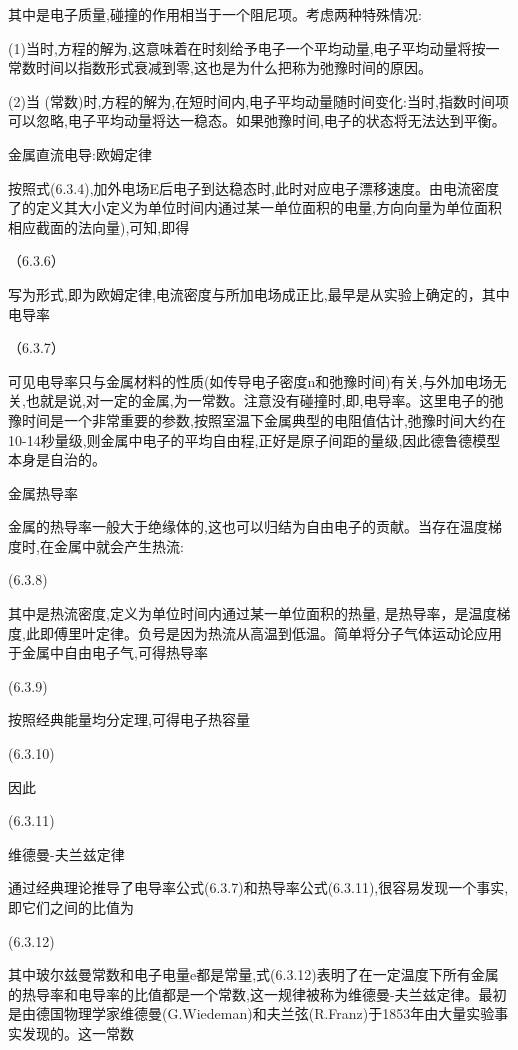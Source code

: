 其中是电子质量,碰撞的作用相当于一个阻尼项。考虑两种特殊情况:

(1)当时,方程的解为,这意味着在时刻给予电子一个平均动量,电子平均动量将按一常数时间以指数形式衰减到零,这也是为什么把称为弛豫时间的原因。

(2)当 (常数)时,方程的解为,在短时间内,电子平均动量随时间变化:当时,指数时间项可以忽略,电子平均动量将达一稳态。如果弛豫时间,电子的状态将无法达到平衡。

金属直流电导:欧姆定律

按照式(6.3.4),加外电场E后电子到达稳态时,此时对应电子漂移速度。由电流密度了的定义其大小定义为单位时间内通过某一单位面积的电量,方向向量为单位面积相应截面的法向量),可知,即得

	（6.3.6）

写为形式,即为欧姆定律,电流密度与所加电场成正比,最早是从实验上确定的，其中电导率

	（6.3.7）

可见电导率只与金属材料的性质(如传导电子密度n和弛豫时间)有关,与外加电场无关,也就是说,对一定的金属,为一常数。注意没有碰撞时,即,电导率。这里电子的弛豫时间是一个非常重要的参数,按照室温下金属典型的电阻值估计,弛豫时间大约在10-14秒量级,则金属中电子的平均自由程,正好是原子间距的量级,因此德鲁德模型本身是自治的。

金属热导率

金属的热导率一般大于绝缘体的,这也可以归结为自由电子的贡献。当存在温度梯度时,在金属中就会产生热流:

 	(6.3.8)

其中是热流密度,定义为单位时间内通过某一单位面积的热量, 是热导率，是温度梯度,此即傅里叶定律。负号是因为热流从高温到低温。简单将分子气体运动论应用于金属中自由电子气,可得热导率

	(6.3.9)

按照经典能量均分定理,可得电子热容量

 	(6.3.10)

因此

 	(6.3.11)





维德曼-夫兰兹定律

通过经典理论推导了电导率公式(6.3.7)和热导率公式(6.3.11),很容易发现一个事实,即它们之间的比值为

 	(6.3.12)

其中玻尔兹曼常数和电子电量e都是常量,式(6.3.12)表明了在一定温度下所有金属的热导率和电导率的比值都是一个常数,这一规律被称为维德曼-夫兰兹定律。最初是由德国物理学家维德曼(G.Wiedeman)和夫兰弦(R.Franz)于1853年由大量实验事实发现的。这一常数

